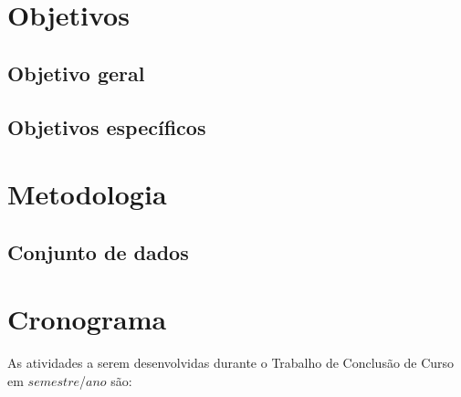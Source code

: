 \documentclass[12pt, a4paper, twoside]{article}
\numberwithin{equation}{subsection} %
\begin{document}
\newpage

\hypertarget{objetivos}{%
\section{Objetivos}\label{objetivos}}

\hypertarget{objetivo-geral}{%
\subsection{Objetivo geral}\label{objetivo-geral}}

\hypertarget{objetivos-especuxedficos}{%
\subsection{Objetivos específicos}\label{objetivos-especuxedficos}}

\newpage

\hypertarget{metodologia}{%
\section{Metodologia}\label{metodologia}}

\hypertarget{conjunto-de-dados}{%
\subsection{Conjunto de dados}\label{conjunto-de-dados}}

\newpage

\hypertarget{cronograma}{%
\section{Cronograma}\label{cronograma}}

As atividades a serem desenvolvidas durante o Trabalho de Conclusão de
Curso em \(semestre\)/\(ano\) são:

\end{document}
